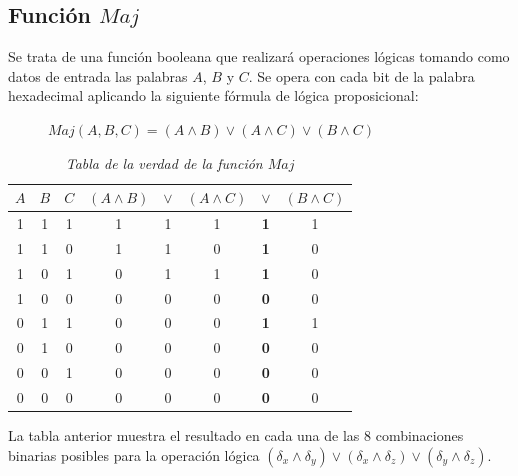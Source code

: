 \documentclass{article}
\begin{document}
    \subsection{Función $Maj$}
        Se trata de una función booleana que realizará operaciones lógicas tomando como datos de entrada las palabras $A$, $B$ y $C$. Se opera con cada bit de la palabra hexadecimal aplicando la siguiente fórmula de lógica proposicional:
            \begin{figure}[H]
            \centering
                $Maj(A, B, C) = (A \land B) \lor (A \land C) \lor ( B \land C)$
            \end{figure}
            \begin{table}[H]
            \centering
            \begin{tabular}{| c c c | c c c c c |} 
                \hline
                $A$ & $B$ & $C$ & $(A \land B)$ & $\lor$ & $(A \land C)$ & $\lor$ & $( B \land C)$ \\
                \hline
                1 & 1 & 1 & 1 & 1 & 1 & \textbf1 & 1 \\
                1 & 1 & 0 & 1 & 1 & 0 & \textbf1 & 0 \\
                1 & 0 & 1 & 0 & 1 & 1 & \textbf1 & 0 \\
                1 & 0 & 0 & 0 & 0 & 0 & \textbf0 & 0 \\
                0 & 1 & 1 & 0 & 0 & 0 & \textbf1 & 1 \\
                0 & 1 & 0 & 0 & 0 & 0 & \textbf0 & 0 \\
                0 & 0 & 1 & 0 & 0 & 0 & \textbf0 & 0 \\
                0 & 0 & 0 & 0 & 0 & 0 & \textbf0 & 0 \\
                \hline
            \end{tabular}
            \caption{\textit{Tabla de la verdad de la función $Maj$}}
            \label{table:2}
            \end{table}
        La tabla anterior muestra el resultado en cada una de las 8 combinaciones binarias posibles para la operación lógica $(\delta_{x} \land \delta_{y}) \lor (\delta_{x} \land \delta_{z}) \lor (\delta_{y} \land \delta_{z})$.
        
\end{document}
